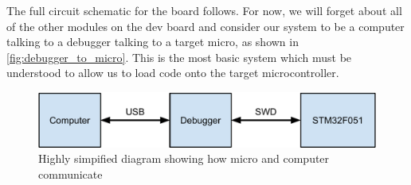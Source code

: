 The full circuit schematic for the board follows. 
For now, we will forget about all of the other modules on the dev board and consider our system to be a computer talking to a debugger talking to a target micro, as shown in \autoref{fig:debugger_to_micro}. 
This is the most basic system which must be understood to allow us to load code onto the target microcontroller.

\begin{figure}[t]
  \includegraphics[width=\textwidth]{./fig/debugger_to_micro.pdf}
  \caption{Highly simpified diagram showing how micro and computer communicate}
  \label{fig:debugger_to_micro}
\end{figure}

\afterpage{
  \begin{landscape}
    \centering
    
 \end{landscape}
} 



